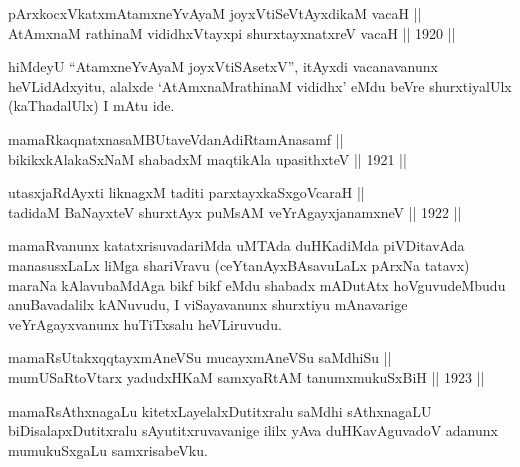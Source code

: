 
\begin{shl}
pArxkocxVkatxmAtamxneYvAyaM joyxVtiSeVtAyxdikaM vacaH || \\
AtAmxnaM rathinaM vididhxVtayxpi shurxtayxnatxreV vacaH \hfill || 1920 ||
  
\end{shl}

\begin{artha}
hiMdeyU ``AtamxneYvAyaM joyxVtiSAsetxV'', itAyxdi vacanavanunx heVLidAdxyitu, alalxde `AtAmxnaMrathinaM vididhx' eMdu beVre shurxtiyalUlx (kaThadalUlx) I mAtu ide.
\end{artha}


\begin{shl}
mamaRkaqnatxnasaMBUtaveVdanAdiRtamAnasamf || \\
bikikxkAlakaSxNaM shabadxM maqtikAla upasithxteV \hfill || 1921 ||
  
\end{shl}

\begin{shl}
utasxjaRdAyxti liknagxM taditi parxtayxkaSxgoVcaraH ||  \\
tadidaM BaNayxteV shurxtAyx puMsAM veYrAgayxjanamxneV \hfill || 1922 ||
  
\end{shl}

\begin{artha}
mamaRvanunx katatxrisuvadariMda uMTAda duHKadiMda piVDitavAda
manasusxLaLx liMga shariVravu (ceYtanAyxBAsavuLaLx pArxNa tatavx)
maraNa kAlavubaMdAga bikf bikf eMdu shabadx mADutAtx hoVguvudeMbudu
anuBavadalilx kANuvudu, I viSayavanunx shurxtiyu mAnavarige
veYrAgayxvanunx huTiTxsalu heVLiruvudu.
\end{artha}

\begin{shl}
mamaRsUtakxqqtayxmAneVSu mucayxmAneVSu saMdhiSu || \\
mumUSaRtoV\s tarx yadudxHKaM samxyaRtAM tanumxmukuSxBiH \hfill || 1923 ||
  
\end{shl}

\begin{artha}
mamaRsAthxnagaLu kitetxLayelalxDutitxralu saMdhi sAthxnagaLU
biDisalapxDutitxralu sAyutitxruvavanige ililx yAva duHKavAguvadoV
adanunx mumukuSxgaLu samxrisabeVku.
\end{artha}

